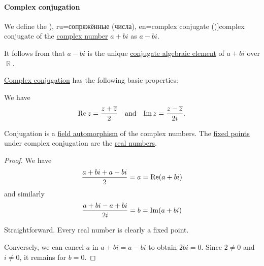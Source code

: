 \paragraph{Complex conjugation}

\begin{definition}\label{def:complex_conjugation}
  We define the \term[bg=(комплексно) спрегнато (число) (\cite[298]{ИлинСадовничиСендов1984АнализТом1}), ru=сопряжённые (числа), en=complex conjugate (\cite[7]{Ahlfors1979ComplexAnalysis})]{complex conjugate} of the \hyperref[def:complex_numbers]{complex number} \( a + bi \) as \( a - bi \).
\end{definition}
\begin{comments}
  \item It follows from  that \( a - bi \) is the unique \hyperref[def:conjugate_algebraic_element]{conjugate algebraic element} of \( a + bi \) over \( \BbbR \).
\end{comments}

\begin{proposition}\label{thm:def:complex_conjugation}
  \hyperref[def:complex_conjugation]{Complex conjugation} has the following basic properties:
  \begin{thmenum}
     We have
    \begin{align*}
      \real z = \frac {z + \oline z} 2
      &&\T{and}&&
      \imag z = \frac {z - \oline z} {2i}.
    \end{align*}

     Conjugation is a \hyperref[def:field/homomorphism]{field automorphism} of the complex numbers.
     The \hyperref[def:function_fixed_point]{fixed points} under complex conjugation are the \hyperref[def:real_numbers]{real numbers}.
  \end{thmenum}
\end{proposition}
\begin{proof}
   We have
  \begin{equation*}
    \frac {a + bi + a - bi} 2 = a = \operatorname{Re}(a + bi)
  \end{equation*}
  and similarly
  \begin{equation*}
    \frac {a + bi - a + bi} {2i} = b = \operatorname{Im}(a + bi)
  \end{equation*}

   Straightforward.
   Every real number is clearly a fixed point.

  Conversely, we can cancel \( a \) in \( a + bi = a - bi \) to obtain \( 2bi = 0 \). Since \( 2 \neq 0 \) and \( i \neq 0 \), it remains for \( b = 0 \).
\end{proof}

